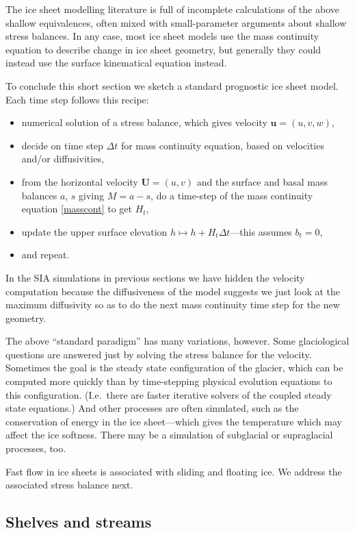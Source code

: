 \documentclass[titlepage,letterpaper,final,12pt]{scrartcl}
\begin{document}
The ice sheet modelling literature is full of incomplete calculations of the above shallow equivalences, often mixed with small-parameter arguments about shallow stress balances.  In any case, most ice sheet models use the mass continuity equation to describe change in ice sheet geometry, but generally they could instead use the surface kinematical equation instead.  

To conclude this short section we sketch a standard prognostic ice sheet model.  Each time step follows this recipe:
  \begin{itemize}
  \item numerical solution of a stress balance, which gives velocity $\mathbf{u}=(u,v,w)$,
  \item decide on time step $\Delta t$ for mass continuity equation, based on velocities and/or diffusivities,
  \item from the horizontal velocity $\mathbf{U}=(u,v)$ and the surface and basal mass balances $a$, $s$ giving $M=a-s$, do a time-step of the mass continuity equation \eqref{masscont} to get $H_t$,
  \item update the upper surface elevation $h \mapsto h + H_t \Delta t$---this assumes $b_t=0$,
  \item and repeat.
  \end{itemize}
In the SIA simulations in previous sections we have hidden the velocity computation because the diffusiveness of the model suggests we just look at the maximum diffusivity so as to do the next mass continuity time step for the new geometry.

The above ``standard paradigm'' has many variations, however.  Some glaciological questions are answered just by solving the stress balance for the velocity.  Sometimes the goal is the steady state configuration of the glacier, which can be computed more quickly than by time-stepping physical evolution equations to this configuration.  (I.e.~there are faster iterative solvers of the coupled steady state equations.)  And other processes are often simulated, such as the conservation of energy in the ice sheet---which gives the temperature which may affect the ice softness.  There may be a simulation of subglacial or supraglacial processes, too.

Fast flow in ice sheets is associated with sliding and floating ice.  We address the associated stress balance next.


\subsection{Shelves and streams} \label{sec:shelvesandstreams}
\end{document}
